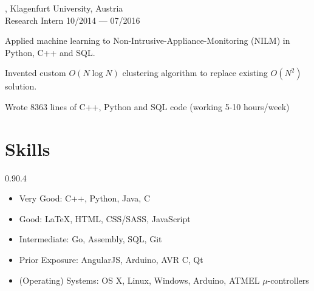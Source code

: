 \begin{entry}
	{, Klagenfurt University, Austria}
	{\\Research Intern}
	{10/2014 --- 07/2016}

\item Applied machine learning to Non-Intrusive-Appliance-Monitoring (NILM) in Python, C++ and SQL.
	\item Invented custom $O(N \log N)$ clustering algorithm to replace existing $O(N^2)$ solution.
	\item Wrote 8363 lines of C++, Python and SQL code (working 5-10 hours/week)
\end{entry}
\vspace{-1mm}

\section{Skills}{0.9}{0.4}
\vspace{-2mm}
\begin{multicols}{2}
	\begin{itemize}
		\item Very Good: C++, Python, Java, C
    \vspace{-2mm}
		\item Good: \LaTeX, HTML, CSS/SASS, JavaScript
    \vspace{-2mm}
		\item Intermediate: Go, Assembly, SQL, Git

		\item Prior Exposure: AngularJS, Arduino, AVR C, Qt
    \vspace{-2mm}
		\item (Operating) Systems: OS X, Linux, Windows, Arduino, ATMEL $\mu$-controllers
    \\
	\end{itemize}
\end{multicols}

\vspace{-2mm}
